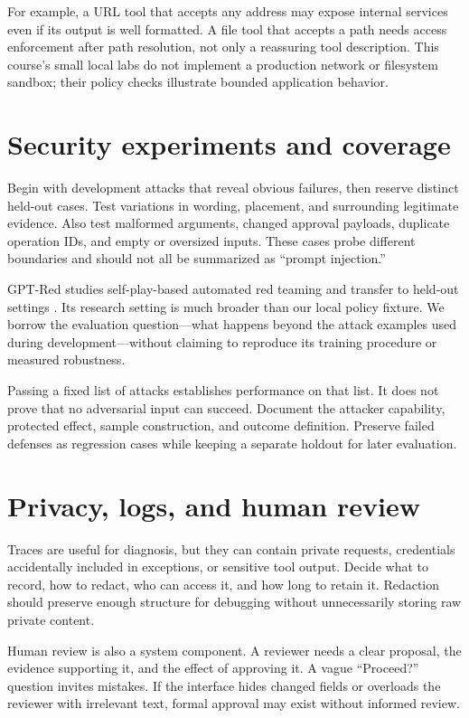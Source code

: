 For example, a URL tool that accepts any address may expose internal services even if its output is well formatted. A file tool that accepts a path needs access enforcement after path resolution, not only a reassuring tool description. This course's small local labs do not implement a production network or filesystem sandbox; their policy checks illustrate bounded application behavior.

\section{Security experiments and coverage}
Begin with development attacks that reveal obvious failures, then reserve distinct held-out cases. Test variations in wording, placement, and surrounding legitimate evidence. Also test malformed arguments, changed approval payloads, duplicate operation IDs, and empty or oversized inputs. These cases probe different boundaries and should not all be summarized as “prompt injection.”

GPT-Red studies self-play-based automated red teaming and transfer to held-out settings \cite{gpt-red}. Its research setting is much broader than our local policy fixture. We borrow the evaluation question—what happens beyond the attack examples used during development—without claiming to reproduce its training procedure or measured robustness.

Passing a fixed list of attacks establishes performance on that list. It does not prove that no adversarial input can succeed. Document the attacker capability, protected effect, sample construction, and outcome definition. Preserve failed defenses as regression cases while keeping a separate holdout for later evaluation.

\section{Privacy, logs, and human review}
Traces are useful for diagnosis, but they can contain private requests, credentials accidentally included in exceptions, or sensitive tool output. Decide what to record, how to redact, who can access it, and how long to retain it. Redaction should preserve enough structure for debugging without unnecessarily storing raw private content.

Human review is also a system component. A reviewer needs a clear proposal, the evidence supporting it, and the effect of approving it. A vague “Proceed?” question invites mistakes. If the interface hides changed fields or overloads the reviewer with irrelevant text, formal approval may exist without informed review.

